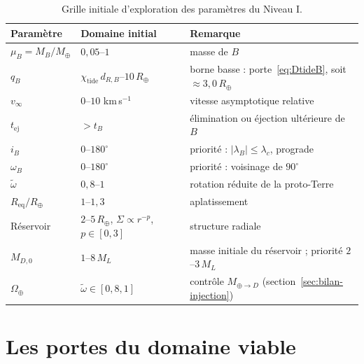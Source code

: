 \documentclass[11pt,a4paper,openany]{report}
\newcommand{\Mt}{M_{\oplus}}
\newcommand{\Rt}{R_{\oplus}}
\newcommand{\Req}{R_{\mathrm{eq}}}
\begin{document}
\begin{table}[htbp]
\centering
\small
\caption{Grille initiale d'exploration des paramètres du Niveau I.}
\label{tab:grille}
\begin{tabular}{lll}
\toprule
\textbf{Paramètre} & \textbf{Domaine initial} & \textbf{Remarque} \\
\midrule
$\mu_B=M_B/\Mt$ & $0{,}05$--$1$ & masse de $B$ \\
$q_B$ & $\chi_{\mathrm{tide}}\,d_{R,B}$--$10\,\Rt$ & borne basse : porte~\eqref{eq:DtideB}, soit $\approx3{,}0\,\Rt$ \\
$v_\infty$ & $0$--$10$ km\,s$^{-1}$ & vitesse asymptotique relative \\
$t_{\mathrm{ej}}$ & $>t_B$ & élimination ou éjection ultérieure de $B$ \\
$i_B$ & $0$--$180^\circ$ & priorité : $|\lambda_B|\le\lambda_c$, prograde \\
$\omega_B$ & $0$--$180^\circ$ & priorité : voisinage de $90^\circ$ \\
$\tilde\omega$ & $0{,}8$--$1$ & rotation réduite de la proto-Terre \\
$\Req/\Rt$ & $1$--$1{,}3$ & aplatissement \\
Réservoir & $2$--$5\,\Rt$, $\Sigma\propto r^{-p}$, $p\in[0,3]$ & structure radiale \\
$M_{D,0}$ & $1$--$8\,M_L$ & masse initiale du réservoir ; priorité $2$--$3\,M_L$ \\
$\Omega_\oplus$ & $\tilde\omega\in[0{,}8,1]$ & contrôle $M_{\oplus\to D}$ (section~\ref{sec:bilan-injection}) \\
\bottomrule
\end{tabular}
\end{table}

\section{Les portes du domaine viable}
\end{document}
